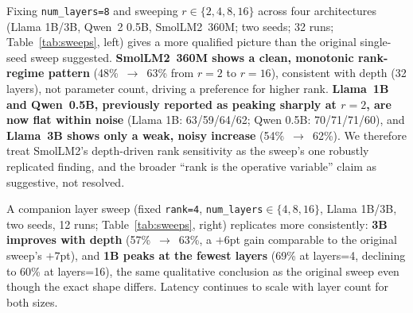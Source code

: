 \documentclass[pdflatex,sn-mathphys-num]{sn-jnl}%
\begin{document}
Fixing \texttt{num\_layers=8} and sweeping $r \in \{2,4,8,16\}$ across four architectures (Llama 1B/3B, Qwen~2 0.5B, SmolLM2~360M; two seeds; 32 runs; Table~\ref{tab:sweeps}, left) gives a more qualified picture than the original single-seed sweep suggested. \textbf{SmolLM2~360M shows a clean, monotonic rank-regime pattern} (48\%~$\to$~63\% from $r{=}2$ to $r{=}16$), consistent with depth (32 layers), not parameter count, driving a preference for higher rank. \textbf{Llama~1B and Qwen~0.5B, previously reported as peaking sharply at $r{=}2$, are now flat within noise} (Llama 1B: 63/59/64/62; Qwen 0.5B: 70/71/71/60), and \textbf{Llama~3B shows only a weak, noisy increase} (54\%~$\to$~62\%). We therefore treat SmolLM2's depth-driven rank sensitivity as the sweep's one robustly replicated finding, and the broader ``rank is the operative variable'' claim as suggestive, not resolved.

A companion layer sweep (fixed \texttt{rank=4}, \texttt{num\_layers}$\in\{4,8,16\}$, Llama 1B/3B, two seeds, 12 runs; Table~\ref{tab:sweeps}, right) replicates more consistently: \textbf{3B improves with depth} (57\%~$\to$~63\%, a $+6$pt gain comparable to the original sweep's $+7$pt), and \textbf{1B peaks at the fewest layers} (69\% at layers=4, declining to 60\% at layers=16), the same qualitative conclusion as the original sweep even though the exact shape differs. Latency continues to scale with layer count for both sizes.
\end{document}
